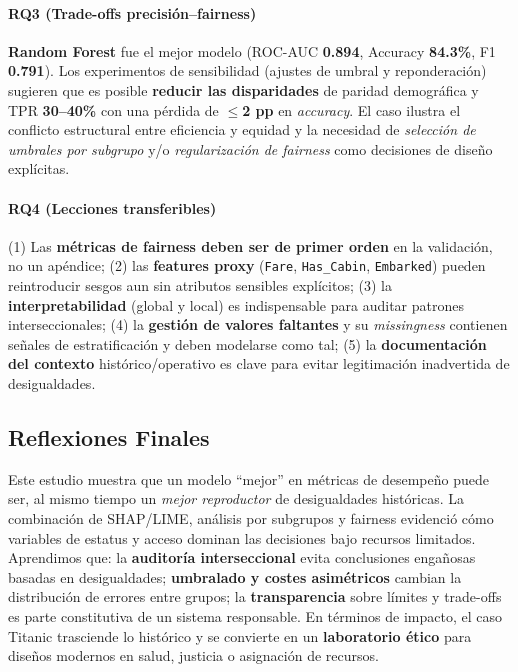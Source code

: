 \documentclass[conference]{IEEEtran}
\begin{document}
\paragraph{RQ3 (Trade-offs precisión–fairness)}
\textbf{Random Forest} fue el mejor modelo (ROC-AUC \textbf{0.894}, Accuracy \textbf{84.3\%}, F1 \textbf{0.791}). Los experimentos de sensibilidad (ajustes de umbral y reponderación) sugieren que es posible \textbf{reducir las disparidades} de paridad demográfica y TPR \textbf{30--40\%} con una pérdida de \textbf{$\leq$2 pp} en \emph{accuracy}. El caso ilustra el conflicto estructural entre eficiencia y equidad y la necesidad de \emph{selección de umbrales por subgrupo} y/o \emph{regularización de fairness} como decisiones de diseño explícitas.

\paragraph{RQ4 (Lecciones transferibles)}
(1) Las \textbf{métricas de fairness deben ser de primer orden} en la validación, no un apéndice; (2) las \textbf{features proxy} (\texttt{Fare}, \texttt{Has\_Cabin}, \texttt{Embarked}) pueden reintroducir sesgos aun sin atributos sensibles explícitos; (3) la \textbf{interpretabilidad} (global y local) es indispensable para auditar patrones interseccionales; (4) la \textbf{gestión de valores faltantes} y su \emph{missingness} contienen señales de estratificación y deben modelarse como tal; (5) la \textbf{documentación del contexto} histórico/operativo es clave para evitar legitimación inadvertida de desigualdades.

\subsection{Reflexiones Finales}

Este estudio muestra que un modelo ``mejor'' en métricas de desempeño puede ser, al mismo tiempo un \emph{mejor reproductor} de desigualdades históricas. La combinación de SHAP/LIME, análisis por subgrupos y fairness evidenció cómo variables de estatus y acceso dominan las decisiones bajo recursos limitados. Aprendimos que: la \textbf{auditoría interseccional} evita conclusiones engañosas basadas en desigualdades; \textbf{umbralado y costes asimétricos} cambian la distribución de errores entre grupos; la \textbf{transparencia} sobre límites y trade-offs es parte constitutiva de un sistema responsable. En términos de impacto, el caso Titanic trasciende lo histórico y se convierte en un \textbf{laboratorio ético} para diseños modernos en salud, justicia o asignación de recursos.
\end{document}
